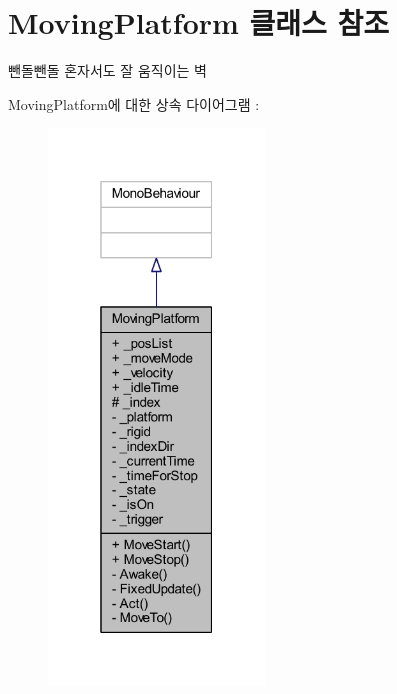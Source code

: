 \hypertarget{class_moving_platform}{}\section{Moving\+Platform 클래스 참조}
\label{class_moving_platform}


뺀돌뺀돌 혼자서도 잘 움직이는 벽  




Moving\+Platform에 대한 상속 다이어그램 \+: 
\nopagebreak
\begin{figure}[H]
\begin{center}
\leavevmode
\includegraphics[width=163pt]{d8/ddd/class_moving_platform__inherit__graph}
\end{center}
\end{figure}


